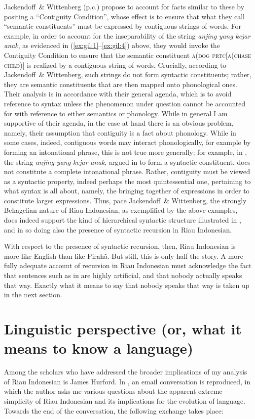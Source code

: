 \documentclass[output=paper]{langscibook}
\begin{document}
Jackendoff~\& Wittenberg (p.c.) propose to account for facts similar to these by positing a ``Contiguity Condition'', whose effect is to ensure that what they call ``semantic constituents'' must be expressed by contiguous strings of words.  For example, in order to account for the inseparability of the string \textit{anjing yang kejar anak}, as evidenced in (\ref{ex:gil:1}--\ref{ex:gil:4}) above, they would invoke the Contiguity Condition to ensure that the semantic constituent \textsc{a(dog prtc[a(chase child)]} is realized by a contiguous string of words.  Crucially, according to Jackendoff~\& Wittenberg, such strings do not form syntactic constituents; rather, they are semantic constituents that are then mapped onto phonological ones.  Their analysis is in accordance with their general agenda, which is to avoid reference to syntax unless the phenomenon under question cannot be accounted for with reference to either semantics or phonology.  While in general I am supportive of their agenda, in the case at hand there is an obvious problem, namely, their assumption that contiguity is a fact about phonology.  While in some cases, indeed, contiguous words may interact phonologically, for example by forming an intonational phrase, this is not true more generally; for example, in , the string \textit{anjing yang kejar anak}, argued in  to form a syntactic constituent, does not constitute a complete intonational phrase.  Rather, contiguity must be viewed as a syntactic property, indeed perhaps the most quintessential one, pertaining to what syntax is all about, namely, the bringing together of expressions in order to constitute larger expressions.  Thus, pace Jackendoff~\& Wittenberg, the strongly Behagelian nature of Riau Indonesian, as exemplified by the above examples, does indeed support the kind of hierarchical syntactic structure illustrated in , and in so doing also the presence of syntactic recursion in Riau Indonesian.

With respect to the presence of syntactic recursion, then, Riau Indonesian is more like English than like Pirahã.  But still, this is only half the story.  A more fully adequate account of recursion in Riau Indonesian must acknowledge the fact that sentences such as in  are highly artificial, and that nobody actually speaks that way.  Exactly what it means to say that nobody speaks that way is taken up in the next section.

\section{Linguistic perspective (or, what it means to know a language)}
Among the scholars who have addressed the broader implications of my analysis of Riau Indonesian is James Hurford. In \citet[410--413]{hurford2011origins}, an email conversation is reproduced, in which the author asks me various questions about the apparent extreme simplicity of Riau Indonesian and its implications for the evolution of language.  Towards the end of the conversation, the following exchange takes place:
\end{document}
